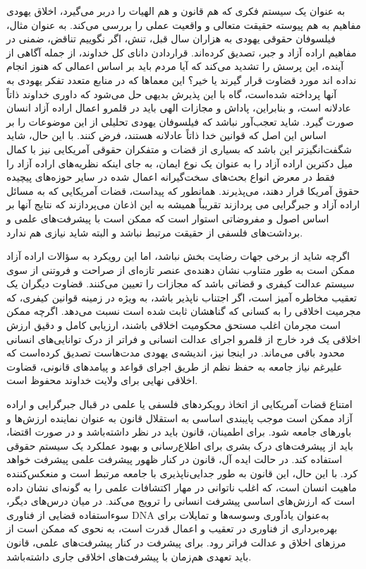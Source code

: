 به عنوان یک سیستم فکری که هم قانون و هم الهیات را در‌بر می‌گیرد، اخلاق یهودی مفاهیم به هم پیوسته حقیقت متعالی و واقعیت عملی را بررسی می‌کند.
به عنوان مثال، فیلسوفان حقوقی یهودی به هزاران سال قبل، تنش، اگر نگوییم تناقض، ضمنی در مفاهیم اراده آزاد و جبر، تصدیق کرده‌اند.
قرار‌دادن دانای کل خداوند، از جمله آگاهی از آینده، این پرسش را تشدید می‌کند که آیا مردم باید بر اساس اعمالی که هنوز انجام نداده اند مورد قضاوت قرار گیرند یا خیر؟ این معماها که در منابع متعدد تفکر یهودی به آنها پرداخته شده‌است، گاه با این پذیرش بدیهی حل می‌شود که داوری خداوند ذاتاً عادلانه است، و بنابراین، پاداش و مجازات الهی باید در قلمرو اعمال اراده آزاد انسان صورت گیرد.
شاید تعجب‌آور نباشد که فیلسوفان یهودی تحلیلی از این موضوعات را بر اساس این اصل که قوانین خدا ذاتاً عادلانه هستند، فرض کنند.
با این حال، شاید شگفت‌انگیزتر این باشد که بسیاری از قضات و متفکران حقوقی آمریکایی نیز با کمال میل دکترین اراده آزاد را به عنوان یک نوع ایمان، به جای اینکه نظریه‌های اراده آزاد را فقط در معرض انواع بحث‌های سخت‌گیرانه اعمال شده در سایر حوزه‌های پیچیده حقوق آمریکا قرار دهند، می‌پذیرند.
همانطور که پیداست، قضات آمریکایی که به مسائل اراده آزاد و جبرگرایی می پردازند تقریباً همیشه به این اذعان می‌پردازند که نتایج آنها بر اساس اصول و مفروضاتی استوار است که ممکن است با پیشرفت‌های علمی و برداشت‌های فلسفی از حقیقت مرتبط نباشد و البته شاید نیازی هم ندارد.

اگرچه شاید از برخی جهات رضایت بخش نباشد، اما این رویکرد به سؤالات اراده آزاد ممکن است به طور متناوب نشان دهنده‌ی عنصر تازه‌ای از صراحت و فروتنی از سوی سیستم عدالت کیفری و قضاتی باشد که مجازات را تعیین می‌کنند.
قضاوت دیگران یک تعقیب مخاطره آمیز است، اگر اجتناب ناپذیر باشد، به ویژه در زمینه قوانین کیفری، که مجرمیت اخلاقی را به کسانی که گناهشان ثابت شده است نسبت می‌دهد.
اگرچه ممکن است مجرمان اغلب مستحق محکومیت اخلاقی باشند، ارزیابی کامل و دقیق ارزش اخلاقی یک فرد خارج از قلمرو اجرای عدالت انسانی و فراتر از درک توانایی‌های انسانی محدود باقی می‌ماند.
در اینجا نیز، اندیشه‌ی یهودی مدت‌هاست تصدیق کرده‌است که علیرغم نیاز جامعه به حفظ نظم از طریق اجرای قواعد و پیامدهای قانونی، قضاوت اخلاقی نهایی برای ولایت خداوند محفوظ است.

امتناع قضات آمریکایی از اتخاذ رویکردهای فلسفی یا علمی در قبال جبرگرایی و اراده آزاد ممکن است موجب پایبندی اساسی به استقلال قانون به عنوان نماینده ارزش‌ها و باورهای جامعه شود.
برای اطمینان، قانون باید در نظر داشته‌باشد و در صورت اقتضا، باید از پیشرفت‌های درک بشری برای اطلاع‌رسانی و بهبود عملکرد یک سیستم حقوقی استفاده کند.
در حالت ایده آل، قانون در کنار ظهور پیشرفت علمی پیشرفت خواهد کرد.
با این حال، این قانون به طور جدایی‌ناپذیری با جامعه مرتبط است و منعکس‌کننده ماهیت انسان است، که اغلب ناتوانی در مهار اکتشافات علمی را به گونه‌ای نشان داده است که ارزش‌های اساسی پیشرفت انسانی را ترویج می‌کند.
در میان درس‌های دیگر، سوء‌استفاده قضایی از فناوری DNA به‌عنوان یادآوری وسوسه‌ها و تمایلات برای بهره‌برداری از فناوری در تعقیب و اعمال قدرت است، به نحوی که ممکن است از مرزهای اخلاق و عدالت فراتر رود.
برای پیشرفت در کنار پیشرفت‌های علمی، قانون باید تعهدی هم‌زمان با پیشرفت‌های اخلاقی جاری داشته‌باشد.
\newline
\newline

